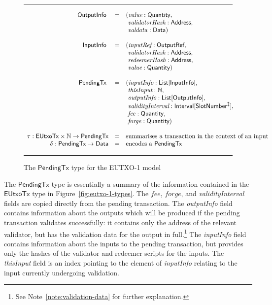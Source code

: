 \documentclass[a4paper]{article}
\newcounter{note}
\renewcommand{\i}{\textit}  %
\newcommand{\s}{\textsf}  %
\newcommand{\msf}[1]{\ensuremath{\mathsf{#1}}}
\newcommand{\mi}[1]{\ensuremath{\mathit{#1}}}
\newcommand\rfskip{7pt}
\newenvironment{ruledfigure}[1]{\begin{figure}[#1]\hrule\vspace{\rfskip}}{\vspace{\rfskip}\hrule\end{figure}}
\newcommand{\List}[1]{\ensuremath{\s{List}[#1]}}
\newcommand{\Interval}[1]{\ensuremath{\s{Interval}[#1]}}
\newcommand{\extended}[1]{#1^\updownarrow}
\newcommand{\ptx}{\ensuremath{\s{PendingTx}}}
\newcommand{\forge}{\mi{forge}}
\newcommand{\fee}{\mi{fee}}
\newcommand{\valdata}{\mi{valdata}}
\newcommand{\Data}{\ensuremath{\s{Data}}}
\newcommand{\slotnum}{\ensuremath{\s{SlotNumber}}}
\newcommand{\eutxotx}{\msf{EUtxoTx}}
\newcommand{\qty}{\ensuremath{\s{Quantity}}}
\newcommand\N{\ensuremath{\mathbb{N}}}
\begin{document}
\begin{ruledfigure}{H}
  \begin{displaymath}
  \begin{array}{rll}
    \s{OutputInfo } &=&(\i{value}: \qty,\\
                    & &\ \i{validatorHash}: \s{Address},\\
                    & &\ \valdata: \Data)\\
    \\
    \s{InputInfo } &=&(\i{inputRef}: \s{OutputRef},\\
                   & &\ \i{validatorHash}: \s{Address},\\
                   & &\ \i{redeemerHash}: \s{Address},\\
                   & &\ \i{value}: \qty)\\
     \\
     \ptx\s{ } &=&(\i{inputInfo}: \List{\s{InputInfo}},\\
               & &\ \i{thisInput}: \N,\\
               & &\ \i{outputInfo}: \List{\s{OutputInfo}},\\
               & &\ \i{validityInterval}: \Interval{\extended{\slotnum}},\\
               & &\ \fee: \qty,\\
               & &\ \forge: \qty)\\
     \\
     \tau: \eutxotx \times \N \rightarrow \ptx &=& \mbox{summarises a transaction in the context of an input}\\
     \delta: \ptx \rightarrow \Data &=& \mbox{encodes a \ptx{}}
  \end{array}
  \end{displaymath}
  \caption{The \ptx{} type for the EUTXO-1 model}
  \label{fig:ptx-1-types}
\end{ruledfigure}
\noindent The \ptx{} type is essentially a summary of the information
contained in the $\eutxotx$ type in
Figure~\ref{fig:eutxo-1-types}. The \fee{}, \forge{}, and
\i{validityInterval} fields are copied directly from the pending
transaction.  The \i{outputInfo} field contains information about the
outputs which will be produced if the pending transaction validates
successfully: it contains only the address of the relevant validator,
but has the validation data for the output in full.\footnote{See
  Note~\ref{note:validation-data} for further explanation.}
The \i{inputInfo} field contains information about the
inputs to the pending transaction, but provides only the hashes of the
validator and redeemer scripts for the inputs.  The \i{thisInput}
field is an index pointing to the element of \i{inputInfo}
relating to the input currently undergoing validation.
\end{document}
